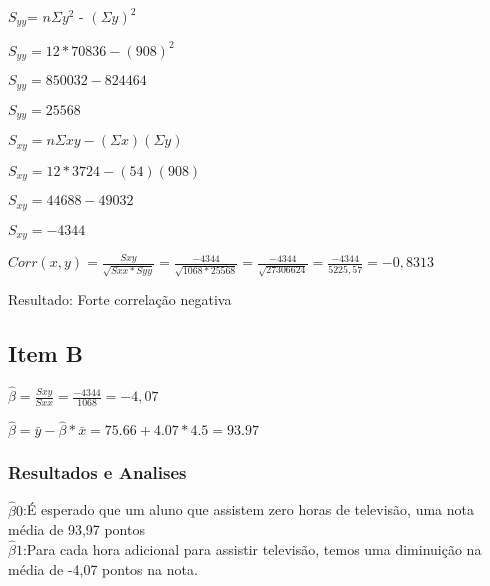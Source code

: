 \documentclass{article}
\begin{document}
            \begin{flushleft}
                $S_{yy}$= $n\Sigma y^2$ - $(\Sigma y)^2$

                $S_{yy} = 12* 70836 - (908)^2$

                $S_{yy} = 850032 - 824464 $

                $S_{yy} = 25568$

            \end{flushleft}

            \begin{flushleft}

            $S_{xy} = n\Sigma xy-(\Sigma x)(\Sigma y)$

            $S_{xy} = 12*3724-(54)(908)$

            $S_{xy} = 44688-49032$ 

            $S_{xy} = -4344$ 

            \end{flushleft}

            \begin{flushleft}
                $Corr(x,y) = \frac{Sxy}{\sqrt{Sxx * Syy}} = \frac{-4344}{\sqrt{1068 * 25568}} =
                            \frac{-4344}{\sqrt{27306624}} = \frac{-4344}{5225,57} = -0,8313 $

            \end{flushleft}

            Resultado: Forte correlação negativa

    \subsection{Item B}

            \begin{flushleft}

                $\hat{\beta} = \frac{Sxy}{Sxx} = \frac{-4344}{1068} = -4,07$

                $\hat{\beta} = \bar{y} - \hat{\beta} * \bar{x} = 75.66+4.07* 4.5 = 93.97$
            \end{flushleft}

            \subsubsection{Resultados e Analises}

            $\hat{\beta}0 $:É esperado que um aluno
            que assistem zero horas de televisão, uma nota média de 93,97 pontos  \\    
            $\hat{\beta}1 $:Para cada hora adicional para assistir televisão,
                    temos uma diminuição na média de -4,07 pontos na nota. 
\end{document}
